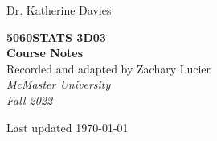 \documentclass[12pt,notitlepage]{article}
\makeatletter
\theoremstyle{theoremc}
\numberwithin{amstheorem}{section}
\numberwithin{amsdefinition}{section}
\numberwithin{amsexample}{section}
\newcommand\HUGE{\@setfontsize\Huge{50}{60}}
\makeatother
\begin{document}
\AddToShipoutPicture*{\bgpic}

\begin{titlepage} %

    \raggedleft %
    
    \vspace*{\baselineskip} %
    
    
    {\Large Dr. Katherine Davies} %
    
    \vspace*{0.167\textheight} %
    
    
    \textbf{\color{main}\HUGE STATS 3D03}\\[\baselineskip]
    \textbf{\color{main}\Huge Course Notes}\\[\baselineskip]

    {\Large Recorded and adapted by Zachary Lucier}\\[1.5\baselineskip]
    
    {\Large \textit{McMaster University}}\\[0.5\baselineskip]
    {\Large \textit{Fall 2022}}

    \vspace*{0.167\textheight}

    Last updated \today
    
    
    
    

\end{titlepage}

\tableofcontents





\end{document}
